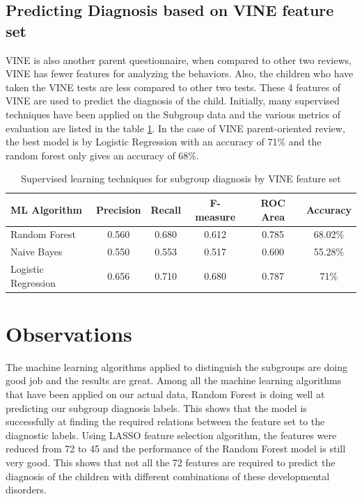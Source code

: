 \subsection{Predicting Diagnosis based on VINE feature set}
VINE is also another parent questionnaire, when compared to other two reviews, VINE has fewer features for analyzing the behaviors. Also, the children who have taken the VINE tests are less compared to other two tests. These 4 features of VINE are used to predict the diagnosis of the child. Initially, many supervised techniques have been applied on the Subgroup data and the various metrics of evaluation are listed in the table \ref{table:47}. In the case of VINE parent-oriented review, the best model is by Logistic Regression with an accuracy of 71\% and the random forest only gives an accuracy of 68\%. 
\begin{table}[h]
\begin{center}
\begin{tabular}{|l|c|c|c|c|c|}
\hline
\textbf{ML Algorithm} &	\textbf{Precision}&	\textbf{Recall}&	\textbf{F-measure}& \textbf{ROC Area}&	\textbf{Accuracy}\\
\hline \hline
Random Forest& 0.560&	0.680&	0.612&	0.785&	68.02\%\\
\hline
Naive Bayes& 0.550&	0.553&	0.517&	0.600&	55.28\%\\
\hline
Logistic Regression& 0.656&	0.710&	0.680&	0.787&	71\%\\
\hline
\end{tabular}
\end{center}
\caption{Supervised learning techniques for subgroup diagnosis by VINE feature set}
\label{table:47}
\end{table}

\section{Observations}
The machine learning algorithms applied to distinguish the subgroups are doing good job and the results are great. Among all the machine learning algorithms that have been applied on our actual data, Random Forest is doing well at predicting our subgroup diagnosis labels. This shows that  the model is successfully at finding the required relations between the feature set to the diagnostic labels. Using LASSO feature selection algorithm, the features were reduced from 72 to 45 and the performance of the Random Forest model is still very good. This shows that not all the 72 features are required to predict the diagnosis of the children with different combinations of these developmental disorders.

